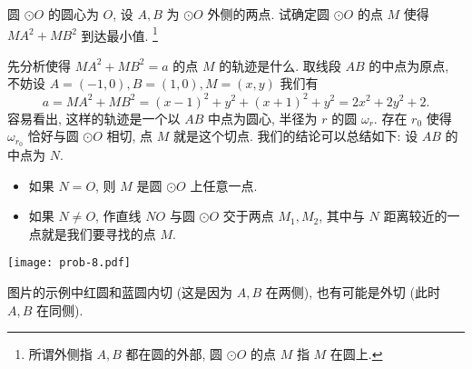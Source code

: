 \begin{prob}
\label{prob:prob-8}
圆 $\odot O$ 的圆心为 $O$, 设 $A, B$ 为 $\odot O$ 外侧的两点.
试确定圆 $\odot O$ 的点 $M$ 使得 $MA^2 + MB^2$ 到达最小值.
\footnote{所谓外侧指 $A, B$ 都在圆的外部,
圆 $\odot O$ 的点 $M$ 指 $M$ 在圆上.}
\end{prob}

\begin{soln}
先分析使得 $MA^2 + MB^2 = a$ 的点 $M$ 的轨迹是什么.
取线段 $AB$ 的中点为原点,
不妨设 $A = (-1, 0), B = (1, 0), M =(x, y)$ 我们有
\[
a = MA^2 + MB^2 = (x-1)^2 + y^2 + (x+1)^2 + y^2 = 2x^2 + 2y^2 + 2.
\]
容易看出, 这样的轨迹是一个以 $AB$ 中点为圆心,
半径为 $r$ 的圆 $\omega_r$. 存在 $r_0$ 使得 $\omega_{r_0}$
恰好与圆 $\odot O$ 相切, 点 $M$ 就是这个切点.
我们的结论可以总结如下: 设 $AB$ 的中点为 $N$.
\begin{itemize}
\item 如果 $N = O$, 则 $M$ 是圆 $\odot O$ 上任意一点.
\item 如果 $N \ne O$, 作直线 $NO$ 与圆 $\odot O$ 交于两点 $M_1, M_2$,
      其中与 $N$ 距离较近的一点就是我们要寻找的点 $M$.
\end{itemize}
\begin{center}
\texttt{[image: prob-8.pdf]}
\end{center}
图片的示例中红圆和蓝圆内切 (这是因为 $A, B$ 在两侧),
也有可能是外切 (此时 $A, B$ 在同侧).
\end{soln}
